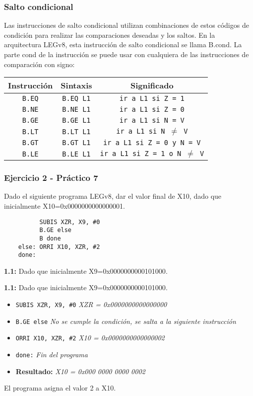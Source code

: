 \documentclass[aspectradio=43]{beamer}
\begin{document}
\begin{frame}
    \frametitle{Salto condicional}
    Las instrucciones de salto condicional utilizan combinaciones de estos códigos de condición para realizar las comparaciones deseadas y los saltos. En la arquitectura LEGv8, esta instrucción de salto condicional se llama B.cond. La parte cond de la instrucción se puede usar con cualquiera de las instrucciones de comparación con signo:
\end{frame}

\begin{frame}
    \begin{table}
        \begin{tabular}{|c|c|c|}
            \hline
            \rowcolor{orange!20}
            \textbf{Instrucción} & \textbf{Sintaxis} & \textbf{Significado} \\
            \hline
            \texttt{B.EQ} & \texttt{B.EQ L1} & \texttt{ir a L1 si Z = 1} \\
            \texttt{B.NE} & \texttt{B.NE L1} & \texttt{ir a L1 si Z = 0} \\
            \texttt{B.GE} & \texttt{B.GE L1} & \texttt{ir a L1 si N = V} \\
            \texttt{B.LT} & \texttt{B.LT L1} & \texttt{ir a L1 si N $\neq$ V} \\
            \texttt{B.GT} & \texttt{B.GT L1} & \texttt{ir a L1 si Z = 0 y N = V} \\
            \texttt{B.LE} & \texttt{B.LE L1} & \texttt{ir a L1 si Z = 1 o N $\neq$ V} \\
            \hline
        \end{tabular}
    \end{table}
\end{frame}

\begin{frame}[containsverbatim]
    \frametitle{Ejercicio 2 - Práctico 7}
    Dado el siguiente programa LEGv8, dar el valor final de X10, dado que inicialmente {X10=0x0000000000000001}.
    \begin{verbatim}
          SUBIS XZR, X9, #0
          B.GE else
          B done
    else: ORRI X10, XZR, #2
    done:
    \end{verbatim}
    \textbf{1.1:} Dado que inicialmente {X9=0x0000000000101000}.
\end{frame}

\begin{frame}
    \textbf{1.1:} Dado que inicialmente {X9=0x0000000000101000}.
    \begin{itemize}
        \item \texttt{SUBIS XZR, X9, \#0} \textit{XZR = 0x0000000000000000}
        \item \texttt{B.GE else} \textit{No se cumple la condición, se salta a la siguiente instrucción}
        \item \texttt{ORRI X10, XZR, \#2} \textit{X10 = 0x0000000000000002}
        \item \texttt{done:} \textit{Fin del programa}
        \item \textbf{Resultado:} \textit{X10 = 0x000 0000 0000 0002}
    \end{itemize}
    El programa asigna el valor 2 a X10.
\end{frame}
\end{document}
